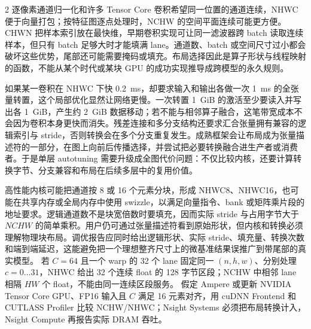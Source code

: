 \begin{solutionexercise}{2}
逐像素通道归一化和许多 Tensor Core 卷积希望同一位置的通道连续，NHWC 便于向量打包；按特征图逐点处理时，NCHW 的空间平面连续可能更方便。CHWN 把样本索引放在最快维，早期卷积实现可让同一滤波器跨 batch 读取连续样本，但只有 batch 足够大时才能填满 lane。通道数、batch 或空间尺寸过小都会破坏这些优势，尾部还可能需要掩码或填充。布局选择因此是算子形状与线程映射的函数，不能从某个时代或某块 GPU 的成功实现推导成跨模型的永久规则。

如果某一卷积在 NHWC 下快 0.2~ms，却要求输入和输出各做一次 1~ms 的全张量转置，这个局部优化显然让网络更慢。一次转置 1~GiB 的激活至少要读入并写出各 1~GiB，产生约 2~GiB 数据移动；若不能与相邻算子融合，这笔带宽成本不会因为卷积本身更快而消失。残差连接和多分支结构还要求汇合张量拥有兼容的逻辑索引与 stride，否则转换会在多个分支重复发生。成熟框架会让布局成为张量描述符的一部分，在图上向前后传播选择，并尝试把必要转换融合进生产者或消费者。于是单层 autotuning 需要升级成全图代价问题：不仅比较内核，还要计算转换字节、分支兼容和布局在后续多层中的复用价值。

高性能内核可能把通道按 8 或 16 个元素分块，形成 NHWC8、NHWC16，也可能在共享内存或全局内存中使用 swizzle，以满足向量指令、bank 或矩阵乘片段的地址要求。逻辑通道数不是块宽倍数时要填充，因而实际 stride 与占用字节大于 $NCHW$ 的简单乘积。用户仍可通过张量描述符看到原始形状，但内核和转换必须理解物理块布局。调优报告应同时给出逻辑形状、实际 stride、填充量、转换次数和端到端延迟，这能避免把一个理想整齐尺寸上的微基准结果误推广到带尾部的真实模型。
\variantheading 若 $C=64$ 且一个 warp 的 32 个 lane 固定同一 $(n,h,w)$、分别处理 $c=0\ldots31$，NHWC 给出 32 个连续 float 的 128 字节区段；NCHW 中相邻 lane 相隔 $HW$ 个 float，不能由同一连续区段服务。
\practiceheading 假定 Ampere 或更新 NVIDIA Tensor Core GPU、FP16 输入且 $C$ 满足 16 元素对齐，用 cuDNN Frontend 和 CUTLASS Profiler 比较 NCHW/NHWC；Nsight Systems 必须把布局转换计入，Nsight Compute 再报告实际 DRAM 吞吐。
\end{solutionexercise}

